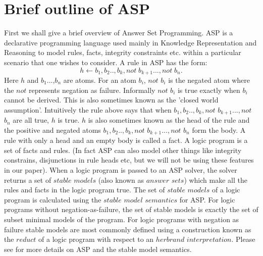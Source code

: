 \section{Brief outline of ASP}
First we shall give a brief overview of Answer Set Programming. ASP is a declarative programming language used mainly in Knowledge Representation and Reasoning to model rules, facts, integrity constraints etc. within a particular scenario that one wishes to consider. A rule in ASP has the form:
\[h\leftarrow b_{1},b_{2}..,b_{k},not\; b_{k+1}...,not\; b_{n}.\]
Here $h$ and $b_{1}$...,$b_{n}$ are atoms. For an atom $b_{i}$, $not$ $b_{i}$ is the negated atom where the $not$ represents negation as failure. Informally $not$ $b_{i}$ is true exactly when $b_{i}$ cannot be derived. This is also sometimes known as the 'closed world assumption'. Intuitively the rule above says that when $b_{1},b_{2}..,b_{k},not$ $b_{k+1}...,not$ $b_{n}$ are all true, $h$ is true. $h$ is also sometimes known as the head of the rule and the positive and negated atoms $b_{1},b_{2}..,b_{k},not$ $b_{k+1}...,not$ $b_{n}$ form the body. A rule with only a head and an empty body is called a fact. A logic program is a set of facts and rules. (In fact ASP can also model other things like integrity constrains, disjunctions in rule heads etc, but we will not be using these features in our paper). When a logic program is passed to an ASP solver, the solver returns a set of $stable$ $models$ (also known as $answer$ $sets$) which make all the rules and facts in the logic program true. The set of $stable$ $models$ of a logic program is calculated using the $stable$ $model$ $semantics$ for ASP. For logic programs without negation-as-failure, the set of stable models is exactly the set of subset minimal models of the program. For logic programs with negation as failure stable models are most commonly defined using a construction known as the $reduct$ of a logic program with respect to an $herbrand$ $interpretation$. Please see \cite{asp_background} for more details on ASP and the stable model semantics.

